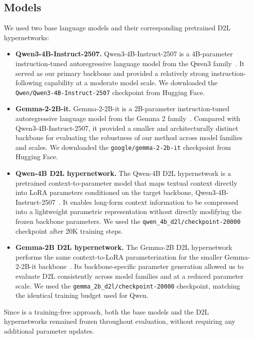 \subsection{Models}
\label{app:models}
We used two base language models and their corresponding pretrained D2L hypernetworks:
\begin{itemize}
    \item \textbf{Qwen3-4B-Instruct-2507.}
    Qwen3-4B-Instruct-2507 is a 4B-parameter instruction-tuned autoregressive language model from the Qwen3 family~\citep{yang2025qwen3}. It served as our primary backbone and provided a relatively strong instruction-following capability at a moderate model scale. We downloaded the \texttt{Qwen/Qwen3-4B-Instruct-2507} checkpoint from Hugging Face.

    \item \textbf{Gemma-2-2B-it.}
    Gemma-2-2B-it is a 2B-parameter instruction-tuned autoregressive language model from the Gemma 2 family~\citep{team2024gemma}. Compared with Qwen3-4B-Instruct-2507, it provided a smaller and architecturally distinct backbone for evaluating the robustness of our method across model families and scales. We downloaded the \texttt{google/gemma-2-2b-it} checkpoint from Hugging Face.

    \item \textbf{Qwen-4B D2L hypernetwork.} The Qwen-4B D2L hypernetwork is a pretrained context-to-parameter model that maps textual context directly into LoRA parameters conditioned on the target backbone, Qwen3-4B-Instruct-2507~\citep{charakorn2026doc}.
    It enables long-form context information to be compressed into a lightweight parametric representation without directly modifying the frozen backbone parameters.
    We used the \texttt{qwen\_4b\_d2l/checkpoint-20000} checkpoint after 20K training steps.

    \item \textbf{Gemma-2B D2L hypernetwork.} The Gemma-2B D2L hypernetwork performs the same context-to-LoRA parameterization for the smaller Gemma-2-2B-it backbone~\citep{charakorn2026doc}.
    Its backbone-specific parameter generation allowed us to evaluate D2L consistently across model families and at a reduced parameter scale.
    We used the \texttt{gemma\_2b\_d2l/checkpoint-20000} checkpoint, matching the identical training budget used for Qwen.
\end{itemize}
Since \method{} is a training-free approach, both the base models and the D2L hypernetworks remained frozen throughout evaluation, without requiring any additional parameter updates.


